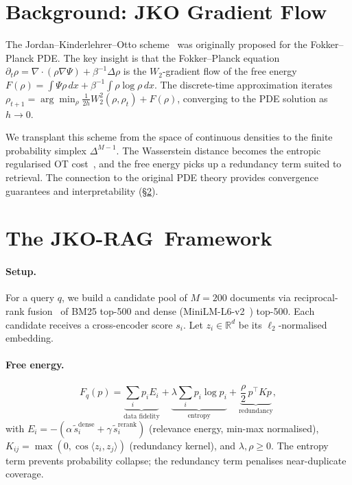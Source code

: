 \documentclass{article}
\theoremstyle{plain}
\newcommand{\jko}{\textsc{JKO-RAG}}
\begin{document}
\section{Background: JKO Gradient Flow}
\label{sec:background}

The Jordan--Kinderlehrer--Otto scheme~\cite{jko1998,santambrogio2015ot,ambrosio2008gradient} was originally proposed for the Fokker--Planck PDE. The key insight is that the Fokker--Planck equation $\partial_t\rho = \nabla\cdot(\rho\nabla\Psi)+\beta^{-1}\Delta\rho$ is the $W_2$-gradient flow of the free energy $F(\rho)=\int\Psi\rho\,dx+\beta^{-1}\int\rho\log\rho\,dx$. The discrete-time approximation iterates
$\rho_{t+1}=\arg\min_\rho\tfrac{1}{2h}W_2^2(\rho,\rho_t)+F(\rho)$,
converging to the PDE solution as $h\to 0$.

We transplant this scheme from the space of continuous densities to the finite probability simplex $\Delta^{M-1}$. The Wasserstein distance becomes the entropic regularised OT cost~\cite{cuturi2013sinkhorn,feydy2019aistats}, and the free energy picks up a redundancy term suited to retrieval. The connection to the original PDE theory provides convergence guarantees and interpretability (\S\ref{sec:method}).


\section{The \jko\ Framework}
\label{sec:method}

\paragraph{Setup.}
For a query $q$, we build a candidate pool of $M{=}200$ documents via reciprocal-rank fusion~\cite{rrf2009} of BM25 top-500 and dense (MiniLM-L6-v2~\cite{reimers2019sbert}) top-500. Each candidate receives a cross-encoder score $s_i$. Let $z_i\in\mathbb{R}^d$ be its $\ell_2$-normalised embedding.

\paragraph{Free energy.}
\begin{equation}
  F_q(p) = \underbrace{\sum_i p_i E_i}_{\text{data fidelity}} + \underbrace{\lambda\sum_i p_i\log p_i}_{\text{entropy}} + \underbrace{\frac{\rho}{2}\,p^\top K p}_{\text{redundancy}},
\label{eq:energy}
\end{equation}
with $E_i = -(\alpha\,\tilde{s}^{\mathrm{dense}}_i + \gamma\,\tilde{s}^{\mathrm{rerank}}_i)$ (relevance energy, min-max normalised), $K_{ij}=\max(0,\cos\langle z_i,z_j\rangle)$ (redundancy kernel), and $\lambda,\rho\geq 0$. The entropy term prevents probability collapse; the redundancy term penalises near-duplicate coverage.
\end{document}
